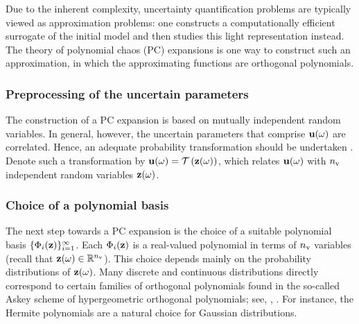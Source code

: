 Due to the inherent complexity, uncertainty quantification problems are typically viewed as approximation problems: one constructs a computationally efficient surrogate of the initial model and then studies this light representation instead.
The theory of polynomial chaos (PC) expansions \cite{maitre2010} is one way to construct such an approximation, in which the approximating functions are orthogonal polynomials.

\subsubsection{Preprocessing of the uncertain parameters}
The construction of a PC expansion is based on mutually independent random variables.
In general, however, the uncertain parameters that comprise $\mathbf{u}(\omega)$ are correlated.
Hence, an adequate probability transformation should be undertaken \cite{eldred2008}.
Denote such a transformation by $\vU(\o) = \oTransform{\vZ(\o)}$, which relates $\mathbf{u}(\omega)$ with ${n_\text{v}}$ independent random variables $\mathbf{z}(\omega)$.

\subsubsection{Choice of a polynomial basis}
The next step towards a PC expansion is the choice of a suitable polynomial basis $\{ \Phi_i(\mathbf{z}) \}_{i = 1}^\infty$.
Each $\Phi_i(\mathbf{z})$ is a real-valued polynomial in terms of ${n_\text{v}}$ variables (recall that $\mathbf{z}(\omega) \in \mathbb{R}^{n_\text{v}}$).
This choice depends mainly on the probability distributions of $\mathbf{z}(\omega)$.
Many discrete and continuous distributions directly correspond to certain families of orthogonal polynomials found in the so-called Askey scheme of hypergeometric orthogonal polynomials; see, \eg, \cite{eldred2008}.
For instance, the Hermite polynomials are a natural choice for Gaussian distributions.

